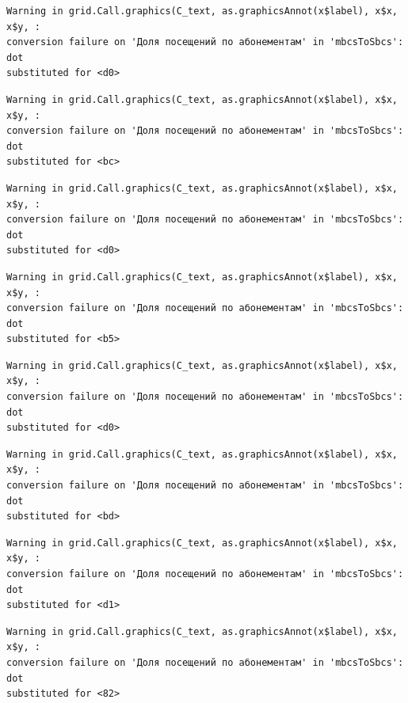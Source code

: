 \documentclass[
  letterpaper,
  DIV=11,
  numbers=noendperiod]{scrartcl}
\begin{document}
\begin{verbatim}
Warning in grid.Call.graphics(C_text, as.graphicsAnnot(x$label), x$x, x$y, :
conversion failure on 'Доля посещений по абонементам' in 'mbcsToSbcs': dot
substituted for <d0>
\end{verbatim}

\begin{verbatim}
Warning in grid.Call.graphics(C_text, as.graphicsAnnot(x$label), x$x, x$y, :
conversion failure on 'Доля посещений по абонементам' in 'mbcsToSbcs': dot
substituted for <bc>
\end{verbatim}

\begin{verbatim}
Warning in grid.Call.graphics(C_text, as.graphicsAnnot(x$label), x$x, x$y, :
conversion failure on 'Доля посещений по абонементам' in 'mbcsToSbcs': dot
substituted for <d0>
\end{verbatim}

\begin{verbatim}
Warning in grid.Call.graphics(C_text, as.graphicsAnnot(x$label), x$x, x$y, :
conversion failure on 'Доля посещений по абонементам' in 'mbcsToSbcs': dot
substituted for <b5>
\end{verbatim}

\begin{verbatim}
Warning in grid.Call.graphics(C_text, as.graphicsAnnot(x$label), x$x, x$y, :
conversion failure on 'Доля посещений по абонементам' in 'mbcsToSbcs': dot
substituted for <d0>
\end{verbatim}

\begin{verbatim}
Warning in grid.Call.graphics(C_text, as.graphicsAnnot(x$label), x$x, x$y, :
conversion failure on 'Доля посещений по абонементам' in 'mbcsToSbcs': dot
substituted for <bd>
\end{verbatim}

\begin{verbatim}
Warning in grid.Call.graphics(C_text, as.graphicsAnnot(x$label), x$x, x$y, :
conversion failure on 'Доля посещений по абонементам' in 'mbcsToSbcs': dot
substituted for <d1>
\end{verbatim}

\begin{verbatim}
Warning in grid.Call.graphics(C_text, as.graphicsAnnot(x$label), x$x, x$y, :
conversion failure on 'Доля посещений по абонементам' in 'mbcsToSbcs': dot
substituted for <82>
\end{verbatim}
\end{document}
